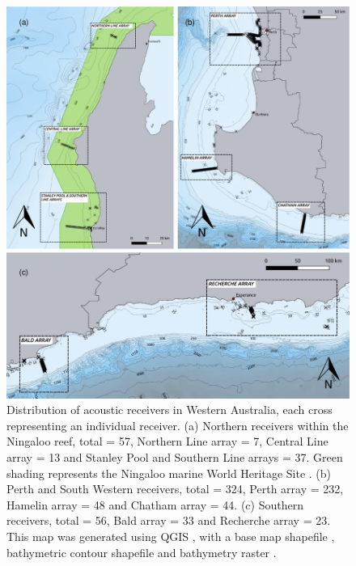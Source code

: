 \documentclass[11pt,a4paper]{article}
\begin{document}
\begin{figure}
	\centering\includegraphics[width=\textwidth]{../Results/arrays_combined2.pdf}
	\caption{Distribution of acoustic receivers in Western Australia, each cross representing an individual receiver. (a) Northern receivers within the Ningaloo reef, total = 57, Northern Line array = 7, Central Line array = 13 and Stanley Pool and Southern Line arrays = 37. Green shading represents the Ningaloo marine World Heritage Site \citep{FlandersMarineInstitute2013}. (b) Perth and South Western receivers, total = 324, Perth array = 232, Hamelin array = 48 and Chatham array = 44. (c) Southern receivers, total = 56, Bald array = 33 and Recherche array = 23. This map was generated using QGIS \citep{QGISDevelopmentTeam2019}, with a base map shapefile \citep{AustralianBureauofStatistics2011}, bathymetric contour shapefile \citep{GEBCOCompilationGroup2019} and bathymetry raster \citep{Whiteway2009}.}
	\label{arrays}
\end{figure}

	
\end{document}

